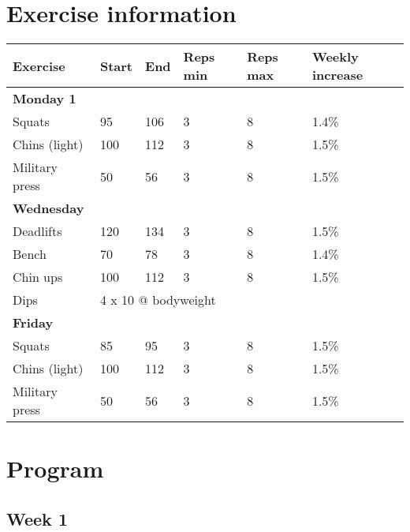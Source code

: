\documentclass[12pt, a4paper]{article}%
\begin{document}
\section*{Exercise information}
\begin{tabular}{llllll}
    \textbf{Exercise} & \textbf{Start} & \textbf{End} & \textbf{Reps min}
    & \textbf{Reps max} & \textbf{Weekly increase} \\ \hline
      \textbf{ Monday 1 } & & & & & \\ \hline
        \hspace{0.5em}Squats & 95  &
         106  & 3 & 8 &
          1.4\%\\
        \hspace{0.5em}Chins (light) & 100  &
         112  & 3 & 8 &
          1.5\%\\
        \hspace{0.5em}Military press & 50  &
         56  & 3 & 8 &
          1.5\%\\
      \textbf{ Wednesday } & & & & & \\ \hline
        \hspace{0.5em}Deadlifts & 120  &
         134  & 3 & 8 &
          1.5\%\\
        \hspace{0.5em}Bench & 70  &
         78  & 3 & 8 &
          1.4\%\\
        \hspace{0.5em}Chin ups & 100  &
         112  & 3 & 8 &
          1.5\%\\
       \hspace{0.5em}Dips & \multicolumn{ 5 }{l}{ 4 x 10 @ bodyweight } \\
      \textbf{ Friday } & & & & & \\ \hline
        \hspace{0.5em}Squats & 85  &
         95  & 3 & 8 &
          1.5\%\\
        \hspace{0.5em}Chins (light) & 100  &
         112  & 3 & 8 &
          1.5\%\\
        \hspace{0.5em}Military press & 50  &
         56  & 3 & 8 &
          1.5\%\\
\end{tabular}


\clearpage
\section*{Program}
 \subsection*{\hspace{0.25em} Week 1 }
\end{document}
